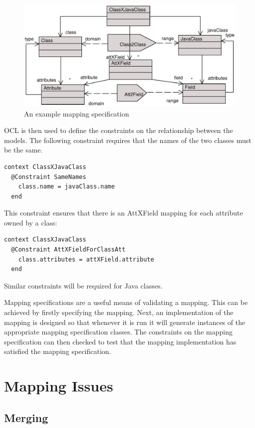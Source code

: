 \begin{figure}[htb]
\begin{center}
\includegraphics[width=12cm]{Mappings/figures/mappingspec.pdf}
\caption{An example mapping specification} \label{mappingspec}
\end{center}
\end{figure}

OCL is then used to define the constraints on the relationship
between the models. The following constraint requires that the
names of the two classes must be the same.

\begin{lstlisting}
context ClassXJavaClass
  @Constraint SameNames
    class.name = javaClass.name
  end
\end{lstlisting}\noindent This constraint ensures that there is an AttXField
mapping for each attribute owned by a class:

\begin{lstlisting}
context ClassXJavaClass
  @Constraint AttXFieldForClassAtt
    class.attributes = attXField.attribute
  end
\end{lstlisting}\noindent Similar constraints will be required for Java classes.

Mapping specifications are a useful means of validating a mapping.
This can be achieved by firstly specifying the mapping. Next, an
implementation of the mapping is designed so that whenever it is
run it will generate instances of the appropriate mapping
specification classes. The constraints on the mapping
specification can then checked to test that the mapping
implementation has satisfied the mapping specification.

\section{Mapping Issues}

\subsection{Merging}

